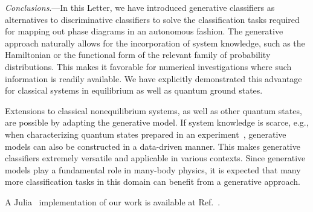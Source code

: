 \documentclass[twocolumn,aps,prl,superscriptaddress,tightlines,nofootinbib]{revtex4-2}
\begin{document}
\emph{Conclusions}.---In this Letter, we have introduced generative classifiers as alternatives to discriminative classifiers to solve the classification tasks required for mapping out phase diagrams in an autonomous fashion. The generative approach naturally allows for the incorporation of system knowledge, such as the Hamiltonian or the functional form of the relevant family of probability distributions. This makes it favorable for numerical investigations where such information is readily available. We have explicitly demonstrated this advantage for classical systems in equilibrium as well as quantum ground states.

Extensions to classical nonequilibrium systems, as well as other quantum states, are possible by adapting the generative model. If system knowledge is scarce, e.g., when characterizing quantum states prepared in an experiment~\cite{carrasquilla:2019,gomez:2022}, generative models can also be constructed in a data-driven manner. This makes generative classifiers extremely versatile and applicable in various contexts. Since generative models play a fundamental role in many-body physics, it is expected that many more classification tasks in this domain can benefit from a generative approach. 

\indent A Julia~\cite{bezanson:2012} implementation of our work is available at Ref.~\cite{github}.\\
\end{document}
